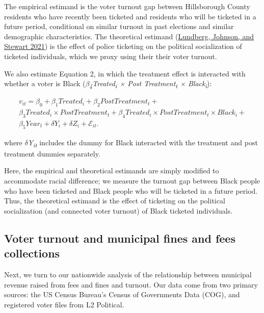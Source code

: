 \documentclass[
  12pt,
]{article}
\begin{document}
The empirical estimand is the voter turnout gap between Hillsborough County residents who have recently been ticketed and residents who will be ticketed in a future period, conditional on similar turnout in past elections and similar demographic characteristics. The theoretical estimand (\protect\hyperlink{ref-Lundberg2021}{Lundberg, Johnson, and Stewart 2021}) is the effect of police ticketing on the political socialization of ticketed individuals, which we proxy using their their voter turnout.

We also estimate Equation 2, in which the treatment effect is interacted with whether a voter is Black (\emph{\(\beta\)\textsubscript{4}Treated\textsubscript{i} × Post Treatment\textsubscript{t} × Black\textsubscript{i}}):

\begin{gather}
\label{eq:2}
v_{it}=\beta_0+\beta_1Treated_{i}+\beta_2Post Treatment_{t} + \nonumber \\
\beta_3Treated_{i}\times Post Treatment_{t} + \beta_4Treated_{i}\times Post Treatment_{t}\times Black_{i} +\\
\beta_5Year_{t} + \delta{Y}_{i} + \delta{Z}_{i} + \mathcal{E}_{it}. \nonumber
\end{gather}

where \emph{\(\delta\)Y\textsubscript{it}} includes the dummy for Black interacted with the treatment and post treatment dummies separately.

Here, the empirical and theoretical estimands are simply modified to accommodate racial difference; we measure the turnout gap between Black people who have been ticketed and Black people who will be ticketed in a future period. Thus, the theoretical estimand is the effect of ticketing on the political socialization (and connected voter turnout) of Black ticketed individuals.

\hypertarget{voter-turnout-and-municipal-fines-and-fees-collections}{%
\subsection*{Voter turnout and municipal fines and fees collections}\label{voter-turnout-and-municipal-fines-and-fees-collections}}

Next, we turn to our nationwide analysis of the relationship between municipal revenue raised from fees and fines and turnout. Our data come from two primary sources: the US Census Bureau's Census of Governments Data (COG), and registered voter files from L2 Political.
\end{document}

